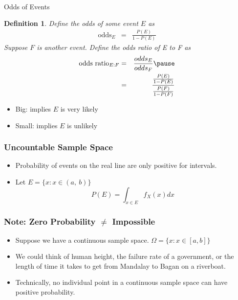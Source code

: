 \documentclass[handout]{beamer}
\newtheorem{defn}{Definition}
\numberwithin{equation}{section}
\begin{document}
\begin{frame}{Odds of Events}

\begin{defn}
Define the odds of some event $E$ as 
\begin{eqnarray}
\text{odds}_{E} & = & \frac{P(E)}{1 - P(E)} \nonumber 
\end{eqnarray}
\pause
Suppose $F$ is another event.  Define the \alert{odds ratio} of E to F as
\begin{eqnarray}
\text{odds ratio}_{E:F} & = & \frac{odds_{E}}{odds_{F}} \nonumber \pause \\
& = & \frac{\frac{P(E)}{1-P(E)}}{\frac{P(F)}{1-P(F)}}\nonumber 
\end{eqnarray}


\end{defn}

\begin{itemize}
\item[-] Big: implies $E$ is very likely
\item[-] Small: implies $E$ is unlikely
\end{itemize}



\end{frame}



\begin{frame}
\frametitle{Uncountable Sample Space} 
\begin{itemize}
\item[] Probability of events on the real line are only positive for intervals.
\item Let $E=\{x : x \in(a,\ b)\}$
$$P(E)=\int_{x \in E} f_X(x) dx$$
 \end{itemize}
\end{frame}


\begin{frame}
\frametitle{Note: Zero Probability $\neq$ Impossible} 

\begin{itemize}
\item Suppose we have a continuous sample space.  $\Omega=\{x : x \in [a,b]\}$
\item We could think of human height, the failure rate of a government, or the length of time it takes to get from Mandalay to Bagan on a riverboat.
\item Technically, no individual point in a continuous sample space can have positive probability.  
\end{itemize}
\end{frame}
\end{document}

